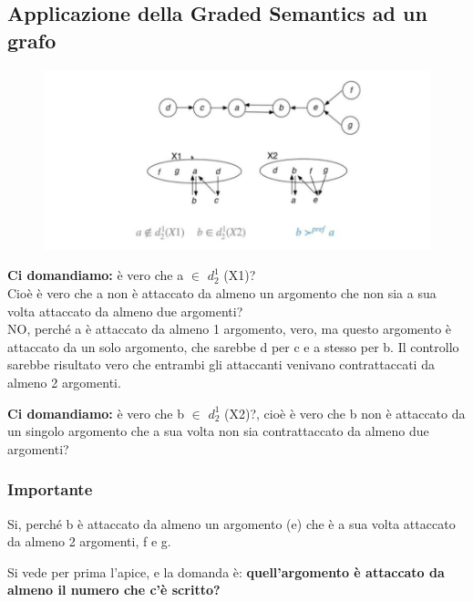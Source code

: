     \subsection{Applicazione della Graded Semantics ad un grafo}
    \begin{figure}[H]
        \centering
        \includegraphics[width=13cm, keepaspectratio]{img/Cap8/GdefnseGrafo.png}
    \end{figure}
    \noindent \textbf{Ci domandiamo:} è vero che a $\in$ $d^1_2$ (X1)?
    \\Cioè è vero che a non è attaccato da almeno un argomento che non sia a sua volta attaccato da almeno due argomenti?
    \\NO, perché a è attaccato da almeno 1 argomento, vero, ma questo argomento è attaccato da un solo argomento, che sarebbe d per c e a stesso per b. Il controllo sarebbe risultato vero che entrambi gli attaccanti venivano contrattaccati da almeno 2 argomenti.

    \vspace{0.4cm}

    \noindent \textbf{Ci domandiamo:} è vero che b $\in$ $d^1_2$ (X2)?, cioè è vero che b non è attaccato da un singolo argomento che a sua volta non sia contrattaccato da almeno due argomenti?

    \subsubsection{\textbf{Importante}}
    Si, perché b è attaccato da almeno un argomento (e) che è a sua volta attaccato da almeno 2 argomenti, f e g.

    \vspace{0.3cm}

    \noindent Si vede per prima l'apice, e la domanda è: \textbf{quell'argomento è attaccato da almeno il numero che c'è scritto?}

    \vspace{0.3cm}

